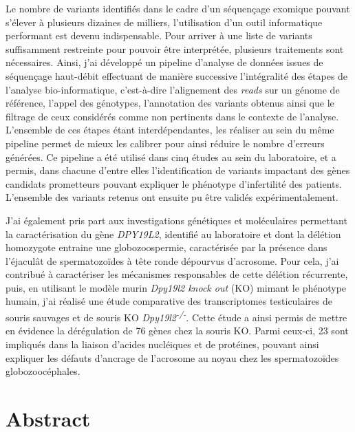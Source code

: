 \documentclass[12pt,twoside]{ugathesis}
\begin{document}
Le nombre de variants identifiés dans le cadre d'un séquençage exomique
pouvant s'élever à plusieurs dizaines de milliers, l'utilisation d'un
outil informatique performant est devenu indispensable. Pour arriver à
une liste de variants suffisamment restreinte pour pouvoir être
interprétée, plusieurs traitements sont nécessaires. Ainsi, j'ai
développé un pipeline d'analyse de données issues de séquençage
haut-débit effectuant de manière successive l'intégralité des étapes de
l'analyse bio-informatique, c'est-à-dire l'alignement des \emph{reads}
sur un génome de référence, l'appel des génotypes, l'annotation des
variants obtenus ainsi que le filtrage de ceux considérés comme non
pertinents dans le contexte de l'analyse. L'ensemble de ces étapes étant
interdépendantes, les réaliser au sein du même pipeline permet de mieux
les calibrer pour ainsi réduire le nombre d'erreurs générées. Ce
pipeline a été utilisé dans cinq études au sein du laboratoire, et a
permis, dans chacune d'entre elles l'identification de variants
impactant des gènes candidats prometteurs pouvant expliquer le phénotype
d'infertilité des patients. L'ensemble des variants retenus ont ensuite
pu être validés expérimentalement.

J'ai également pris part aux investigations génétiques et moléculaires
permettant la caractérisation du gène \emph{DPY19L2}, identifié au
laboratoire et dont la délétion homozygote entraine une globozoospermie,
caractérisée par la présence dans l'éjaculât de spermatozoïdes à tête
ronde dépourvus d'acrosome. Pour cela, j'ai contribué à caractériser les
mécanismes responsables de cette délétion récurrente, puis, en utilisant
le modèle murin \emph{Dpy19l2 knock out} (KO) mimant le phénotype
humain, j'ai réalisé une étude comparative des transcriptomes
testiculaires de souris sauvages et de souris KO
\emph{Dpy19l2\textsuperscript{-/-}}. Cette étude a ainsi permis de
mettre en évidence la dérégulation de 76 gènes chez la souris KO. Parmi
ceux-ci, 23 sont impliqués dans la liaison d'acides nucléiques et de
protéines, pouvant ainsi expliquer les défauts d'ancrage de l'acrosome
au noyau chez les spermatozoïdes globozoocéphales.

\newpage

\chapter*{Abstract}\label{abstract}

\newpage
\end{document}
